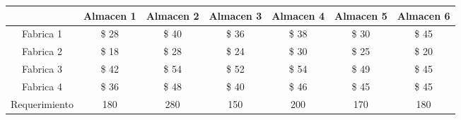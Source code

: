 \begin{tabular}{ccccccc}
       & Almacen 1 & Almacen 2 & Almacen 3 & Almacen 4 & Almacen 5 & Almacen 6 \bigstrut[b]\\
\hline
\hline
Fabrica 1 &  \$           28  &  \$            40  &  \$                36  &  \$           38  &  \$           30  &  \$           45  \bigstrut[t]\\
Fabrica 2 &  \$           18  &  \$            28  &  \$                24  &  \$           30  &  \$           25  &  \$           20  \\
Fabrica 3 &  \$           42  &  \$            54  &  \$                52  &  \$           54  &  \$           49  &  \$           45  \\
Fabrica 4 &  \$           36  &  \$            48  &  \$                40  &  \$           46  &  \$           45  &  \$           45  \bigstrut[b]\\
\hline
\hline
Requerimiento & 180    & 280    & 150    & 200    & 170    & 180 \bigstrut\\
\hline
\hline
\end{tabular}%
